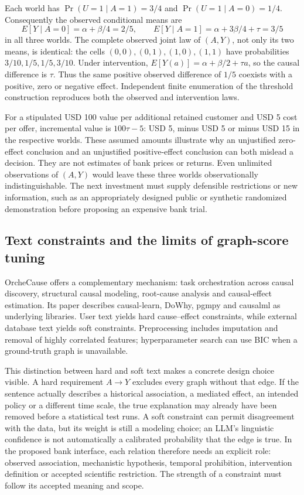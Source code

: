 Each world has $\Pr(U=1\mid A=1)=3/4$ and
$\Pr(U=1\mid A=0)=1/4$. Consequently the observed conditional means are
\begin{equation}
 E[Y\mid A=0]=\alpha+\beta/4=2/5,\qquad
 E[Y\mid A=1]=\alpha+3\beta/4+\tau=3/5
 \label{exec17:frontier-observed}
\end{equation}
in all three worlds. The complete observed joint law of $(A,Y)$, not only
its two means, is identical: the cells $(0,0),(0,1),(1,0),(1,1)$ have
probabilities $3/10,1/5,1/5,3/10$. Under intervention,
$E[Y(a)]=\alpha+\beta/2+\tau a$, so the causal difference is $\tau$.
Thus the same positive observed difference of $1/5$ coexists with a
positive, zero or negative effect. Independent finite enumeration of the
threshold construction reproduces both the observed and intervention laws.
\citep{exec17_frontier_exact}

For a stipulated USD 100 value per additional retained customer and USD 5
cost per offer, incremental value is $100\tau-5$: USD 5, minus USD 5 or
minus USD 15 in the respective worlds. These assumed amounts illustrate why
an unjustified zero-effect conclusion and an unjustified positive-effect
conclusion can both mislead a decision. They are not estimates of bank prices
or returns. Even unlimited observations of $(A,Y)$ would leave these three
worlds observationally indistinguishable. The next investment must supply
defensible restrictions or new information, such as an appropriately designed
public or synthetic randomized demonstration before proposing an expensive
bank trial.~\citep{exec17_frontier_exact}

\subsection{Text constraints and the limits of graph-score tuning}

OrcheCause offers a complementary mechanism: task orchestration across causal
discovery, structural causal modeling, root-cause analysis and causal-effect
estimation. Its paper describes causal-learn, DoWhy, pgmpy and causalml as
underlying libraries. User text yields hard cause--effect constraints, while
external database text yields soft constraints. Preprocessing includes
imputation and removal of highly correlated features; hyperparameter search
can use BIC when a ground-truth graph is unavailable.
\citep{exec17_frontier_yang}

This distinction between hard and soft text makes a concrete design choice
visible. A hard requirement $A\to Y$ excludes every graph without that edge.
If the sentence actually describes a historical association, a mediated
effect, an intended policy or a different time scale, the true explanation
may already have been removed before a statistical test runs. A soft
constraint can permit disagreement with the data, but its weight is still
a modeling choice; an LLM's linguistic confidence is not automatically a
calibrated probability that the edge is true. In the proposed bank interface,
each relation therefore needs an explicit role: observed association,
mechanistic hypothesis, temporal prohibition, intervention definition or
accepted scientific restriction. The strength of a constraint must follow
its accepted meaning and scope.

